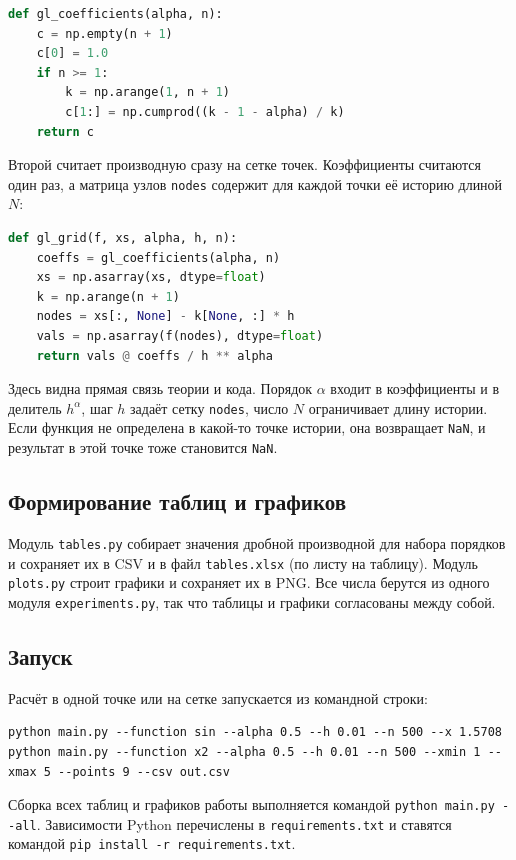\documentclass[14pt,a4paper]{extarticle}
\begin{document}
\begin{lstlisting}[language=Python]
def gl_coefficients(alpha, n):
    c = np.empty(n + 1)
    c[0] = 1.0
    if n >= 1:
        k = np.arange(1, n + 1)
        c[1:] = np.cumprod((k - 1 - alpha) / k)
    return c
\end{lstlisting}

Второй считает производную сразу на сетке точек. Коэффициенты считаются один раз, а матрица узлов \texttt{nodes} содержит для каждой точки её историю длиной $N$:

\begin{lstlisting}[language=Python]
def gl_grid(f, xs, alpha, h, n):
    coeffs = gl_coefficients(alpha, n)
    xs = np.asarray(xs, dtype=float)
    k = np.arange(n + 1)
    nodes = xs[:, None] - k[None, :] * h
    vals = np.asarray(f(nodes), dtype=float)
    return vals @ coeffs / h ** alpha
\end{lstlisting}

Здесь видна прямая связь теории и кода. Порядок $\alpha$ входит в коэффициенты и в делитель $h^{\alpha}$, шаг $h$ задаёт сетку \texttt{nodes}, число $N$ ограничивает длину истории. Если функция не определена в какой-то точке истории, она возвращает \texttt{NaN}, и результат в этой точке тоже становится \texttt{NaN}.

\subsection{Формирование таблиц и графиков}

Модуль \texttt{tables.py} собирает значения дробной производной для набора порядков и сохраняет их в CSV и в файл \texttt{tables.xlsx} (по листу на таблицу). Модуль \texttt{plots.py} строит графики и сохраняет их в PNG. Все числа берутся из одного модуля \texttt{experiments.py}, так что таблицы и графики согласованы между собой.

\subsection{Запуск}
\label{sec:run}

Расчёт в одной точке или на сетке запускается из командной строки:
\begin{lstlisting}
python main.py --function sin --alpha 0.5 --h 0.01 --n 500 --x 1.5708
python main.py --function x2 --alpha 0.5 --h 0.01 --n 500 --xmin 1 --xmax 5 --points 9 --csv out.csv
\end{lstlisting}
Сборка всех таблиц и графиков работы выполняется командой \texttt{python main.py -{}-all}. Зависимости Python перечислены в \texttt{requirements.txt} и ставятся командой \texttt{pip install -r requirements.txt}.
\end{document}
